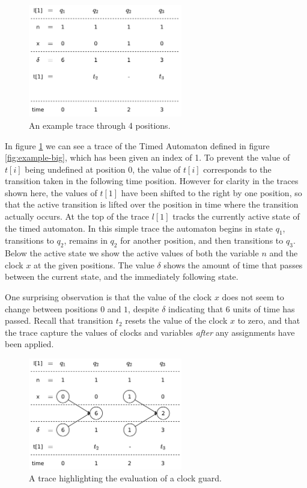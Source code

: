 \documentclass[a4paper,12pt]{article}
\begin{document}
\begin{figure}[h]
  \centering
  \includegraphics[width=0.6\textwidth]{trace-shift-min}
  \caption{An example trace through 4 positions.}
  \label{fig:trace-min}
\end{figure}

In figure \ref{fig:trace-min} we can see a trace of the Timed Automaton defined
in figure \ref{fig:example-big}, which has been given an index of 1. To prevent
the value of $t[i]$ being undefined at position $0$, the value of $t[i]$
corresponds to the transition taken in the following time position. However for
clarity in the traces shown here, the values of $t[1]$ have been shifted to the
right by one position, so that the active transition is lifted over the position
in time where the transition actually occurs. At the top of the trace $l[1]$
tracks the currently active state of the timed automaton. In this simple trace
the automaton begins in state $q_{1}$, transitions to $q_{2}$, remains in
$q_{2}$ for another position, and then transitions to $q_{3}$. Below the active
state we show the active values of both the variable $n$ and the clock $x$ at
the given positions. The value $\delta$ shows the amount of time that passes
between the current state, and the immediately following state.

One surprising observation is that the value of the clock $x$ does not seem to
change between positions $0$ and $1$, despite $\delta$ indicating that $6$ units
of time has passed. Recall that transition $t_{2}$ resets the value of the clock
$x$ to zero, and that the trace capture the values of clocks and variables
\emph{after} any assignments have been applied.

\begin{figure}[h]
  \centering
  \includegraphics[width=0.6\textwidth]{trace-shift-delta}
  \caption{A trace highlighting the evaluation of a clock guard.}
  \label{fig:trace-delta}
\end{figure}
\end{document}
